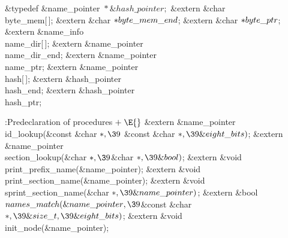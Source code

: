 \&{typedef} \&{name\_pointer} ${}{*}\&{hash\_pointer};{}$\6
\&{extern} \&{char} \\{byte\_mem}[\,];\6
\&{extern} \&{char} ${}{*}\\{byte\_mem\_end}{}$;%
\6
\&{extern} \&{char} ${}{*}\\{byte\_ptr}{}$;\6
\&{extern} \&{name\_info} \\{name\_dir}[\,];\6
\&{extern} \&{name\_pointer} \\{name\_dir\_end};%
\6
\&{extern} \&{name\_pointer} \\{name\_ptr};\6
\&{extern} \&{name\_pointer} \\{hash}[\,];\6
\&{extern} \&{hash\_pointer} \\{hash\_end};\6
\&{extern} \&{hash\_pointer} \\{hash\_ptr};\par
\fi

\B{}:Predeclaration of procedures\X${}\mathrel+\E{}$\6
\&{extern} \&{name\_pointer} \\{id\_lookup}(\&{const} \&{char} ${}{*},\39{}$%
\&{const} \&{char} ${}{*},\39\&{eight\_bits}){}$;\6
\&{extern} \&{name\_pointer} \\{section\_lookup}(\&{char} ${}{*},\39{}$\&{char}
${}{*},\39\&{bool}){}$;\6
\&{extern} \&{void} \\{print\_prefix\_name}(\&{name\_pointer});\6
\&{extern} \&{void} \\{print\_section\_name}(\&{name\_pointer});\6
\&{extern} \&{void} \\{sprint\_section\_name}(\&{char} ${}{*},\39\&{name%
\_pointer}){}$;\7
\&{extern} \&{bool} ${}\\{names\_match}(\&{name\_pointer},\39{}$\&{const} %
\&{char} ${}{*},\39\&{size\_t},\39\&{eight\_bits}){}$;\6
\&{extern} \&{void} \\{init\_node}(\&{name\_pointer});\par
\fi

